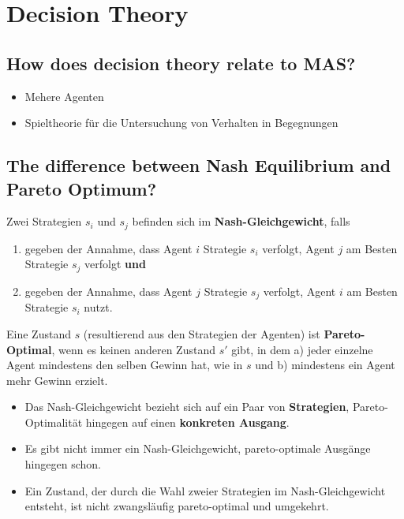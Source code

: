 \section{Decision Theory}
\subsection{How does decision theory relate to MAS?}
\begin{itemize}
	\item Mehere Agenten
	\item Spieltheorie für die Untersuchung von Verhalten in Begegnungen
\end{itemize}
\subsection{The difference between Nash Equilibrium and Pareto Optimum?}
Zwei Strategien $s_i$ und $s_j$ befinden sich im \textbf{Nash-Gleichgewicht}, falls
\begin{enumerate}
	\item gegeben der Annahme, dass Agent $i$ Strategie $s_i$ verfolgt, Agent $j$ am Besten Strategie $s_j$ verfolgt \textbf{und}
	\item gegeben der Annahme, dass Agent $j$ Strategie $s_j$ verfolgt, Agent $i$ am Besten Strategie $s_i$ nutzt.
\end{enumerate}
Eine Zustand $s$ (resultierend aus den Strategien der Agenten) ist \textbf{Pareto-Optimal}, wenn es keinen anderen Zustand $s'$ gibt, in dem a) jeder einzelne Agent mindestens den selben Gewinn hat, wie in $s$ und b) mindestens ein Agent mehr Gewinn erzielt. 

\begin{itemize}
	\item Das Nash-Gleichgewicht bezieht sich auf ein Paar von \textbf{Strategien}, Pareto-Optimalität hingegen auf einen \textbf{konkreten Ausgang}.
	\item Es gibt nicht immer ein Nash-Gleichgewicht, pareto-optimale Ausgänge hingegen schon.
	\item Ein Zustand, der durch die Wahl zweier Strategien im Nash-Gleichgewicht entsteht, ist nicht zwangsläufig pareto-optimal und umgekehrt. 
\end{itemize}
